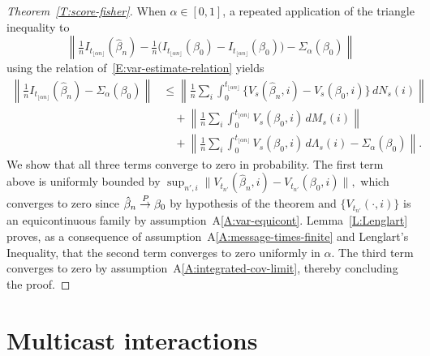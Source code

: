 \documentclass[final]{statsoc}
\begin{document}
\begin{proof}[Theorem~\ref{T:score-fisher}]
When $\alpha \in [0, 1]$, a repeated application of the triangle
inequality to
\[
    \left\|
        \tfrac{1}{n} I_{t_{\lfloor \alpha n \rfloor}}(\hat \beta_n)
        -
        \tfrac{1}{n} \big(
            I_{t_{\lfloor \alpha n \rfloor}}(\beta_0)
            -
            I_{t_{\lfloor \alpha n \rfloor}}(\beta_0)
        \big)
        -
        \Sigma_{\alpha} (\beta_0)
    \right\|
\]
using the relation of~\eqref{E:var-estimate-relation} yields
\begin{align*}
    \left\|
        \tfrac{1}{n} I_{t_{\lfloor \alpha n \rfloor}}(\hat \beta_n)
        -
        \Sigma_{\alpha} (\beta_0)
    \right\|
        &\leq
        \left\|
            \frac{1}{n}
            \sum_i
            \int_0^{t_{\lfloor \alpha n \rfloor}}
                \{
                    V_s(\hat \beta_n, i)
                    -
                    V_s(\beta_0, i)
                \} \, dN_s(i)
        \right\| \\
        &\quad+
        \left\|
            \frac{1}{n}
            \sum_i
            \int_0^{t_{\lfloor \alpha n \rfloor}}
                V_s(\beta_0, i) \, dM_s(i)
        \right\| \\
        &\quad+
        \left\|
            \frac{1}{n}
            \sum_i
            \int_0^{t_{\lfloor \alpha n \rfloor}}
                V_s(\beta_0,i)
                \, d\Lambda_s(i)
            -
            \Sigma_{\alpha}(\beta_0)
        \right\|.
\end{align*}
We show that all three terms converge to zero in probability.
The first term above is uniformly bounded by
\(
    \sup_{n',i}
        \|
            V_{t_{n'}}(\hat \beta_n, i)
            -
            V_{t_{n'}}(\beta_0, i)
        \|,
\)
which converges to zero since $\hat \beta_n \overset{\mathit{P}}{\to} \beta_0$ by
hypothesis of the theorem and $\{ V_{t_{n'}}(\cdot, i) \}$ is an
equicontinuous family by assumption~A\ref{A:var-equicont}.
Lemma~\ref{L:Lenglart} proves, as a consequence of
assumption~A\ref{A:message-times-finite} and Lenglart's \citeyearpar{lenglart1977relation}
Inequality, that the second term converges
to zero uniformly in $\alpha$.
The third term converges to zero by
assumption~A\ref{A:integrated-cov-limit}, thereby concluding the proof.

\end{proof}


\section{Multicast interactions}\label{S:multiple-receivers}
\end{document}
